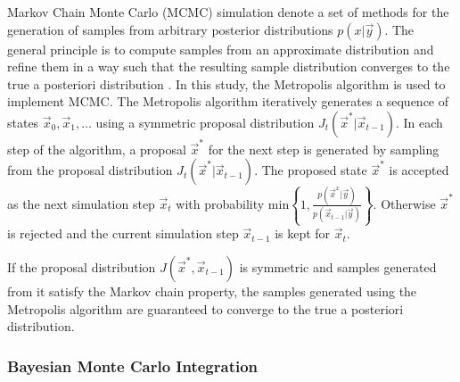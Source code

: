 \documentclass[journal abbreviation, manuscript]{copernicus}
\begin{document}
Markov Chain Monte Carlo (MCMC) simulation denote a set of methods for the
generation of samples from arbitrary posterior distributions $p(x | \vec{y})$.
The general principle is to compute samples from an approximate distribution and
refine them in a way such that the resulting sample distribution converges to
the true a posteriori distribution \citep{bda}. In this study, the Metropolis
algorithm is used to implement MCMC. The Metropolis algorithm iteratively
generates a sequence of states $\vec{x}_0, \vec{x}_1, \ldots$ using a symmetric
proposal distribution $J_t(\vec{x}^* | \vec{x}_{t-1})$. In each step of the
algorithm, a proposal $\vec{x}^*$ for the next step is generated by sampling
from the proposal distribution $J_t(\vec{x}^* | \vec{x}_{t-1})$. The proposed
state $\vec{x}^*$ is accepted as the next simulation step $\vec{x}_t$ with probability
$\text{min} \left \{1, \frac{p(\vec{x}^x | \vec{y})}{p(\vec{x}_{t-1} | \vec{y})}
\right \}$. Otherwise $\vec{x}^*$ is rejected and the current simulation step $\vec{x}_{t-1}$
is kept for $\vec{x}_t$.

    If the proposal distribution $J(\vec{x}^*, \vec{x}_{t-1})$ is symmetric and
    samples generated from it satisfy the Markov chain property, the samples
    generated using the Metropolis algorithm are guaranteed to converge to the
    true a posteriori distribution.

\subsubsection{Bayesian Monte Carlo Integration}
\end{document}
